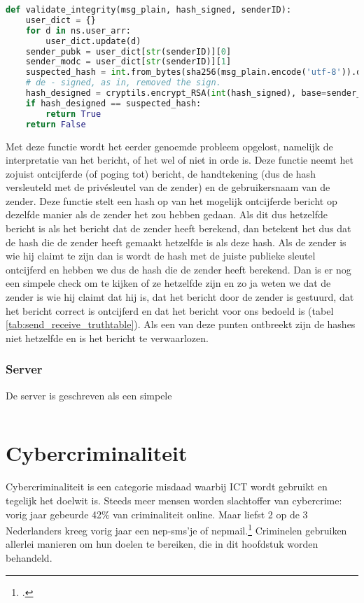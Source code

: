 \documentclass{report} %
\begin{document}
\begin{lstlisting}[language=Python, firstnumber=16]
def validate_integrity(msg_plain, hash_signed, senderID):
    user_dict = {}
    for d in ns.user_arr:
        user_dict.update(d)
    sender_pubk = user_dict[str(senderID)][0]
    sender_modc = user_dict[str(senderID)][1]
    suspected_hash = int.from_bytes(sha256(msg_plain.encode('utf-8')).digest(), 'big')
    # de - signed, as in, removed the sign.
    hash_designed = cryptils.encrypt_RSA(int(hash_signed), base=sender_pubk, modulo=sender_modc)
    if hash_designed == suspected_hash:
        return True
    return False
\end{lstlisting}
Met deze functie wordt het eerder genoemde probleem opgelost, namelijk de interpretatie van het bericht, of het wel of niet in orde is. Deze functie neemt het zojuist ontcijferde (of poging tot) bericht, de handtekening (dus de hash versleuteld met de privésleutel van de zender) en de gebruikersnaam van de zender. Deze functie stelt een hash op van het mogelijk ontcijferde bericht op dezelfde manier als de zender het zou hebben gedaan. Als dit dus hetzelfde bericht is als het bericht dat de zender heeft berekend, dan betekent het dus dat de hash die de zender heeft gemaakt hetzelfde is als deze hash. Als de zender is wie hij claimt te zijn dan is wordt de hash met de juiste publieke sleutel ontcijferd en hebben we dus de hash die de zender heeft berekend. Dan is er nog een simpele check om te kijken of ze hetzelfde zijn en zo ja weten we dat de zender is wie hij claimt dat hij is, dat het bericht door de zender is gestuurd, dat het bericht correct is ontcijferd en dat het bericht voor ons bedoeld is (tabel \ref{tab:send_receive_truthtable}). Als een van deze punten ontbreekt zijn de hashes niet hetzelfde en is het bericht te verwaarlozen.

\subsection{Server} 
De server is geschreven als een simpele 
\begin{lstlisting}[language=Python, firstnumber=16]

\end{lstlisting}

\chapter{Cybercriminaliteit}
Cybercriminaliteit is een categorie misdaad waarbij ICT wordt gebruikt en tegelijk het doelwit is. Steeds meer mensen worden slachtoffer van cybercrime: vorig jaar gebeurde 42\% van criminaliteit online. Maar liefst 2 op de 3 Nederlanders kreeg vorig jaar een nep-sms'je of nepmail.\footnote{\cite{OM_cybercrime}.} Criminelen gebruiken allerlei manieren om hun doelen te bereiken, die in dit hoofdstuk worden behandeld.
\end{document}
